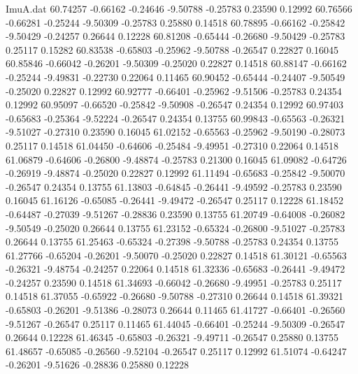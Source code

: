 \begin{filecontents}{ImuA.dat}
  60.74257   -0.66162   -0.24646   -9.50788   -0.25783    0.23590    0.12992
  60.76566   -0.66281   -0.25244   -9.50309   -0.25783    0.25880    0.14518
  60.78895   -0.66162   -0.25842   -9.50429   -0.24257    0.26644    0.12228
  60.81208   -0.65444   -0.26680   -9.50429   -0.25783    0.25117    0.15282
  60.83538   -0.65803   -0.25962   -9.50788   -0.26547    0.22827    0.16045
  60.85846   -0.66042   -0.26201   -9.50309   -0.25020    0.22827    0.14518
  60.88147   -0.66162   -0.25244   -9.49831   -0.22730    0.22064    0.11465
  60.90452   -0.65444   -0.24407   -9.50549   -0.25020    0.22827    0.12992
  60.92777   -0.66401   -0.25962   -9.51506   -0.25783    0.24354    0.12992
  60.95097   -0.66520   -0.25842   -9.50908   -0.26547    0.24354    0.12992
  60.97403   -0.65683   -0.25364   -9.52224   -0.26547    0.24354    0.13755
  60.99843   -0.65563   -0.26321   -9.51027   -0.27310    0.23590    0.16045
  61.02152   -0.65563   -0.25962   -9.50190   -0.28073    0.25117    0.14518
  61.04450   -0.64606   -0.25484   -9.49951   -0.27310    0.22064    0.14518
  61.06879   -0.64606   -0.26800   -9.48874   -0.25783    0.21300    0.16045
  61.09082   -0.64726   -0.26919   -9.48874   -0.25020    0.22827    0.12992
  61.11494   -0.65683   -0.25842   -9.50070   -0.26547    0.24354    0.13755
  61.13803   -0.64845   -0.26441   -9.49592   -0.25783    0.23590    0.16045
  61.16126   -0.65085   -0.26441   -9.49472   -0.26547    0.25117    0.12228
  61.18452   -0.64487   -0.27039   -9.51267   -0.28836    0.23590    0.13755
  61.20749   -0.64008   -0.26082   -9.50549   -0.25020    0.26644    0.13755
  61.23152   -0.65324   -0.26800   -9.51027   -0.25783    0.26644    0.13755
  61.25463   -0.65324   -0.27398   -9.50788   -0.25783    0.24354    0.13755
  61.27766   -0.65204   -0.26201   -9.50070   -0.25020    0.22827    0.14518
  61.30121   -0.65563   -0.26321   -9.48754   -0.24257    0.22064    0.14518
  61.32336   -0.65683   -0.26441   -9.49472   -0.24257    0.23590    0.14518
  61.34693   -0.66042   -0.26680   -9.49951   -0.25783    0.25117    0.14518
  61.37055   -0.65922   -0.26680   -9.50788   -0.27310    0.26644    0.14518
  61.39321   -0.65803   -0.26201   -9.51386   -0.28073    0.26644    0.11465
  61.41727   -0.66401   -0.26560   -9.51267   -0.26547    0.25117    0.11465
  61.44045   -0.66401   -0.25244   -9.50309   -0.26547    0.26644    0.12228
  61.46345   -0.65803   -0.26321   -9.49711   -0.26547    0.25880    0.13755
  61.48657   -0.65085   -0.26560   -9.52104   -0.26547    0.25117    0.12992
  61.51074   -0.64247   -0.26201   -9.51626   -0.28836    0.25880    0.12228

\end{filecontents}

